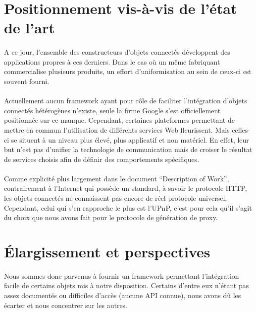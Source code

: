 \documentclass[nocopyrightspace]{sigplanconf}
\begin{document}
\section{Positionnement vis-à-vis de l’état de l’art}

	\paragraph{}
	A ce jour, l’ensemble des constructeurs d’objets connectés développent des applications propres à ces derniers. Dans le cas où un même fabriquant commercialise plusieurs produits, un effort d’uniformisation au sein de ceux-ci est souvent fourni.

	\paragraph{}
	Actuellement aucun framework ayant pour rôle de faciliter l’intégration d’objets connectés hétérogènes n’existe, seule la firme Google s’est officiellement positionnée sur ce manque\cite{physicalweb}. Cependant, certaines plateformes permettant de mettre en commun l’utilisation de différents services Web fleurissent. Mais celles-ci se situent à un niveau plus élevé, plus applicatif et non matériel. En effet, leur but n’est pas d’unifier la technologie de communication mais de croiser le résultat de services choisis afin de définir des comportements spécifiques.

	\paragraph{}
	Comme explicité plus largement dans le document “Description of Work”, contrairement à l’Internet qui possède un standard, à savoir le protocole HTTP, les objets connectés ne connaissent pas encore de réel protocole universel. Cependant, celui qui s’en rapproche le plus est l’UPnP, c’est pour cela qu’il s’agit du choix que nous avons fait pour le protocole de génération de proxy.


\section{Élargissement et perspectives}

	\paragraph{}
	Nous sommes donc parvenus à fournir un framework permettant l’intégration facile de certains objets mis à notre disposition. Certains d’entre eux n’étant pas assez documentés ou difficiles d’accès (aucune API connue), nous avons dû les écarter et nous concentrer sur les autres.
\end{document}
